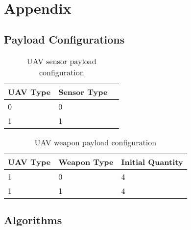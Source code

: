 \chapter{Appendix}


\section{Payload Configurations}
\label{sec:pyldConfigs}
\begin{table}[H]
	\caption{UAV sensor payload configuration}
	\centering
	\label{tab:uavSensorMap}
	\begin{tabular}{|p{1cm}|p{1cm}|p{1cm}|}
		\hline
		UAV Type & Sensor Type\\ \hline
		0 & 0 \\
		1 & 1 \\
		\hline
	\end{tabular}
\end{table}

\begin{table}[H]
	\caption{UAV weapon payload configuration}
	\centering
	\label{tab:uavWpnMap}
	\begin{tabular}{|p{1cm}|p{1.5cm}|p{2cm}|}
		\hline
		UAV Type & Weapon Type & Initial Quantity\\ \hline
		1 & 0 & 4 \\
		1 & 1 & 4 \\
		\hline
	\end{tabular}
\end{table}


\section{Algorithms}
\label{sec:algorithms}

